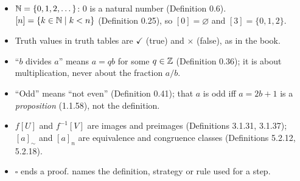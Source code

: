 \begin{key}
\begin{itemize}
\item $\mathbb{N}=\{0,1,2,\dots\}$: $0$ is a natural number (Definition 0.6). $[n]=\{k\in\mathbb{N}\mid k<n\}$ (Definition 0.25), so $[0]=\varnothing$ and $[3]=\{0,1,2\}$.
\item Truth values in truth tables are $\checkmark$ (true) and $\times$ (false), as in the book.
\item ``$b$ divides $a$'' means $a=qb$ for some $q\in\mathbb{Z}$ (Definition 0.36); it is about multiplication, never about the fraction $a/b$.
\item ``Odd'' means ``not even'' (Definition 0.41); that $a$ is odd iff $a=2b+1$ is a \emph{proposition} (1.1.58), not the definition.
\item $f[U]$ and $f^{-1}[V]$ are images and preimages (Definitions 3.1.31, 3.1.37); $[a]_\sim$ and $[a]_n$ are equivalence and congruence classes (Definitions 5.2.12, 5.2.18).
\item $\square$ ends a proof.  names the definition, strategy or rule used for a step.
\end{itemize}
\end{key}
